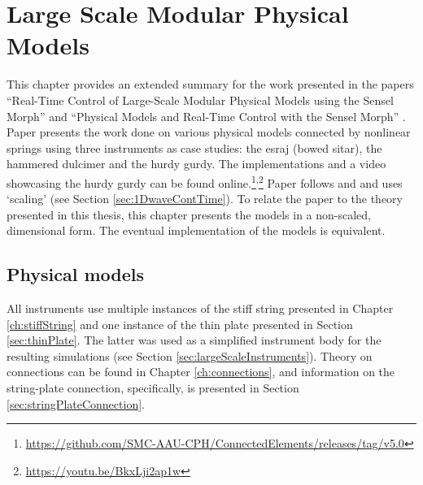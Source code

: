 \chapter{Large Scale Modular Physical Models}\label{ch:largeScale}
This chapter provides an extended summary for the work presented in the papers ``Real-Time Control of Large-Scale Modular Physical Models using the Sensel Morph'' \citeP[A] and ``Physical Models and Real-Time Control with the Sensel Morph'' \citeP[B].  Paper \citeP[A] presents the work done on various physical models connected by nonlinear springs using three instruments as case studies: the esraj (bowed sitar), the hammered dulcimer and the hurdy gurdy. The implementations and a video showcasing the hurdy gurdy can be found online.\footnote{\url{https://github.com/SMC-AAU-CPH/ConnectedElements/releases/tag/v5.0}}\textsuperscript{,}\footnote{\url{https://youtu.be/BkxLji2ap1w}} Paper \citeP[A] follows \cite{theBible} and \cite{Bilbao2009Modular} and uses `scaling' (see Section \ref{sec:1DwaveContTime}). To relate the paper to the theory presented in this thesis, this chapter presents the models in a non-scaled, dimensional form. The eventual implementation of the models is equivalent. 

\section{Physical models}\label{sec:modelsLargeScale}
All instruments use multiple instances of the stiff string presented in Chapter \ref{ch:stiffString} and one instance of the thin plate presented in Section \ref{sec:thinPlate}. The latter was used as a simplified instrument body for the resulting simulations (see Section \ref{sec:largeScaleInstruments}). Theory on connections can be found in Chapter \ref{ch:connections}, and information on the string-plate connection, specifically, is presented in Section \ref{sec:stringPlateConnection}.

